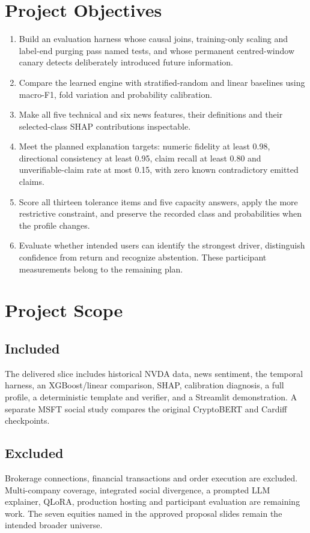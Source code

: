 \section{Project Objectives}
\begin{enumerate}
\item Build an evaluation harness whose causal joins, training-only scaling and label-end purging pass named tests, and whose permanent centred-window canary detects deliberately introduced future information.
\item Compare the learned engine with stratified-random and linear baselines using macro-F1, fold variation and probability calibration.
\item Make all five technical and six news features, their definitions and their selected-class SHAP contributions inspectable.
\item Meet the planned explanation targets: numeric fidelity at least 0.98, directional consistency at least 0.95, claim recall at least 0.80 and unverifiable-claim rate at most 0.15, with zero known contradictory emitted claims.
\item Score all thirteen tolerance items and five capacity answers, apply the more restrictive constraint, and preserve the recorded class and probabilities when the profile changes.
\item Evaluate whether intended users can identify the strongest driver, distinguish confidence from return and recognize abstention. These participant measurements belong to the remaining plan.
\end{enumerate}
\section{Project Scope}
\subsection*{Included}
The delivered slice includes historical NVDA data, news sentiment, the temporal harness, an XGBoost/linear comparison, SHAP, calibration diagnosis, a full profile, a deterministic template and verifier, and a Streamlit demonstration. A separate MSFT social study compares the original CryptoBERT and Cardiff checkpoints.
\subsection*{Excluded}
Brokerage connections, financial transactions and order execution are excluded. Multi-company coverage, integrated social divergence, a prompted LLM explainer, QLoRA, production hosting and participant evaluation are remaining work. The seven equities named in the approved proposal slides remain the intended broader universe.
